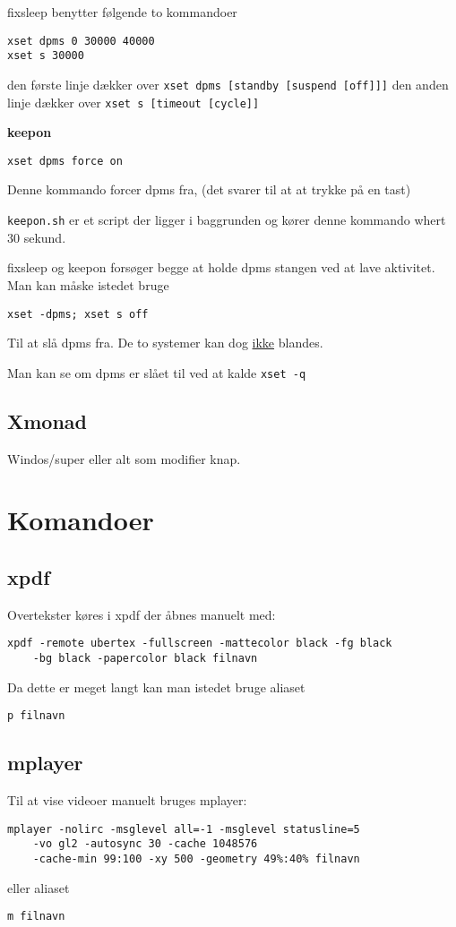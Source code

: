 \documentclass[10pt,a4paper,danish]{article}
\newcommand{\code}[1]{\colorbox{verbgray}{\texttt{#1}}}
\begin{document}
fixsleep benytter følgende to kommandoer
\begin{verbatim}
xset dpms 0 30000 40000
xset s 30000
\end{verbatim}
den første linje dækker over \texttt{xset dpms [standby [suspend [off]]]}
den anden linje dækker over \texttt{xset s [timeout [cycle]]}

\textbf{keepon}
\begin{verbatim}
xset dpms force on
\end{verbatim}
Denne kommando forcer dpms fra, (det svarer til at at trykke på en tast)

\texttt{keepon.sh} er et script der ligger i baggrunden og kører denne kommando
whert 30 sekund.


fixsleep og keepon forsøger begge at holde dpms stangen ved at lave aktivitet.
Man kan måske istedet bruge
\begin{verbatim}
xset -dpms; xset s off
\end{verbatim}
Til at slå dpms fra.
De to systemer kan dog \uline{ikke} blandes.

Man kan se om dpms er slået til ved at kalde \code{xset -q}
\subsection{Xmonad}
Windos/super eller alt som modifier knap.

\section{Komandoer}

\subsection{xpdf}
Overtekster køres i xpdf der åbnes manuelt med:
\begin{verbatim}
xpdf -remote ubertex -fullscreen -mattecolor black -fg black
    -bg black -papercolor black filnavn
\end{verbatim}
Da dette er meget langt kan man istedet bruge aliaset
\begin{verbatim}
p filnavn
\end{verbatim}


\subsection{mplayer}
Til at vise videoer manuelt bruges mplayer:
\begin{verbatim}
mplayer -nolirc -msglevel all=-1 -msglevel statusline=5
    -vo gl2 -autosync 30 -cache 1048576
    -cache-min 99:100 -xy 500 -geometry 49%:40% filnavn
\end{verbatim}
eller aliaset
\begin{verbatim}
m filnavn
\end{verbatim}
\end{document}
